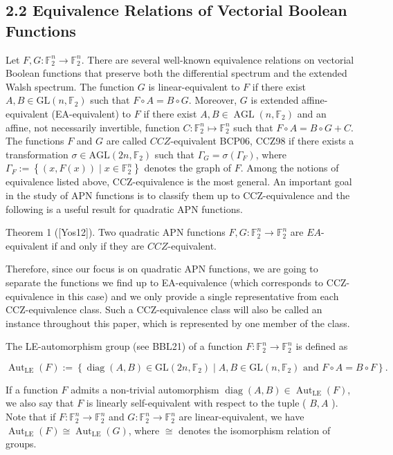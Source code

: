 \documentclass[10pt]{article}
\begin{document}
\subsection*{2.2 Equivalence Relations of Vectorial Boolean Functions}
Let $F, G: \mathbb{F}_{2}^{n} \rightarrow \mathbb{F}_{2}^{n}$. There are several well-known equivalence relations on vectorial Boolean functions that preserve both the differential spectrum and the extended Walsh spectrum. The function $G$ is linear-equivalent to $F$ if there exist $A, B \in \mathrm{GL}\left(n, \mathbb{F}_{2}\right)$ such that $F \circ A=B \circ G$. Moreover, $G$ is extended affine-equivalent (EA-equivalent) to $F$ if there exist $A, B \in \operatorname{AGL}\left(n, \mathbb{F}_{2}\right)$ and an affine, not necessarily invertible, function $C: \mathbb{F}_{2}^{n} \mapsto \mathbb{F}_{2}^{n}$ such that $F \circ A=B \circ G+C$. The functions $F$ and $G$ are called $C C Z$-equivalent BCP06, CCZ98 if there exists a transformation $\sigma \in \mathrm{AGL}\left(2 n, \mathbb{F}_{2}\right)$ such that $\Gamma_{G}=\sigma\left(\Gamma_{F}\right)$, where $\Gamma_{F}:=\left\{(x, F(x)) \mid x \in \mathbb{F}_{2}^{n}\right\}$ denotes the graph of $F$. Among the notions of equivalence listed above, CCZ-equivalence is the most general. An important goal in the study of APN functions is to classify them up to CCZ-equivalence and the following is a useful result for quadratic APN functions.

Theorem 1 ([Yos12]). Two quadratic APN functions $F, G: \mathbb{F}_{2}^{n} \rightarrow \mathbb{F}_{2}^{n}$ are $E A$-equivalent if and only if they are $C C Z$-equivalent.

Therefore, since our focus is on quadratic APN functions, we are going to separate the functions we find up to EA-equivalence (which corresponds to CCZ-equivalence in this case) and we only provide a single representative from each CCZ-equivalence class. Such a CCZ-equivalence class will also be called an instance throughout this paper, which is represented by one member of the class.

The LE-automorphism group (see BBL21) of a function $F: \mathbb{F}_{2}^{n} \rightarrow \mathbb{F}_{2}^{n}$ is defined as

$$
\operatorname{Aut}_{\mathrm{LE}}(F):=\left\{\operatorname{diag}(A, B) \in \mathrm{GL}\left(2 n, \mathbb{F}_{2}\right) \mid A, B \in \mathrm{GL}\left(n, \mathbb{F}_{2}\right) \text { and } F \circ A=B \circ F\right\} .
$$

If a function $F$ admits a non-trivial automorphism $\operatorname{diag}(A, B) \in \operatorname{Aut}_{\mathrm{LE}}(F)$, we also say that $F$ is linearly self-equivalent with respect to the tuple ( $B, A$ ). Note that if $F: \mathbb{F}_{2}^{n} \rightarrow \mathbb{F}_{2}^{n}$ and $G: \mathbb{F}_{2}^{n} \rightarrow \mathbb{F}_{2}^{n}$ are linear-equivalent, we have $\operatorname{Aut}_{\mathrm{LE}}(F) \cong \operatorname{Aut}_{\mathrm{LE}}(G)$, where $\cong$ denotes the isomorphism relation of groups.
\end{document}
